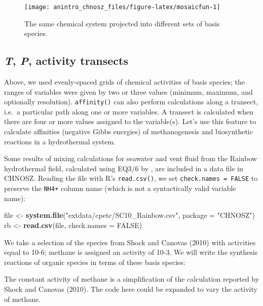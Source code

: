 \documentclass[]{tufte-handout}
\newenvironment{Shaded}{}{}
\newcommand{\KeywordTok}[1]{\textcolor[rgb]{0.00,0.44,0.13}{\textbf{#1}}}
\newcommand{\DataTypeTok}[1]{\textcolor[rgb]{0.56,0.13,0.00}{#1}}
\newcommand{\StringTok}[1]{\textcolor[rgb]{0.25,0.44,0.63}{#1}}
\newcommand{\OtherTok}[1]{\textcolor[rgb]{0.00,0.44,0.13}{#1}}
\newcommand{\NormalTok}[1]{#1}
\begin{document}
\begin{figure}
\texttt{[image: anintro\_chnosz\_files/figure-latex/mosaicfun-1]} \caption[The same chemical system projected into different sets of basis species]{The same chemical system projected into different sets of basis species.}\label{fig:mosaicfun}
\end{figure}

\hypertarget{t-p-activity-transects}{\subsection{\texorpdfstring{\emph{T},
\emph{P}, activity
transects}{T, P, activity transects}}\label{t-p-activity-transects}}

Above, we used evenly-spaced grids of chemical activities of basis
species; the ranges of variables were given by two or three values
(minimum, maximum, and optionally resolution). {\texttt{affinity()}} can
also perform calculations along a transect, i.e.~a particular path along
one or more variables. A transect is calculated when there are four or
more values assigned to the variable(s). Let's use this feature to
calculate affinities (negative Gibbs energies) of methanogenesis and
biosynthetic reactions in a hydrothermal system.

Some results of mixing calculations for seawater and vent fluid from the
Rainbow hydrothermal field, calculated using EQ3/6 by \citet{SC10}, are
included in a data file in CHNOSZ. Reading the file with R's
\texttt{read.csv()}, we set \texttt{check.names\ =\ FALSE} to preserve
the \texttt{NH4+} column name (which is not a syntactically valid
variable name):

\begin{Shaded}
\begin{Highlighting}[]
\NormalTok{file <-}\StringTok{ }\KeywordTok{system.file}\NormalTok{(}\StringTok{"extdata/cpetc/SC10_Rainbow.csv"}\NormalTok{, }\DataTypeTok{package =} \StringTok{"CHNOSZ"}\NormalTok{)}
\NormalTok{rb <-}\StringTok{ }\KeywordTok{read.csv}\NormalTok{(file, }\DataTypeTok{check.names =} \OtherTok{FALSE}\NormalTok{)}
\end{Highlighting}
\end{Shaded}

We take a selection of the species from Shock and Canovas (2010) with
activities equal to 10-6; methane is assigned an activity of 10-3. We
will write the synthesis reactions of organic species in terms of these
basis species:

\begin{marginfigure}
The constant activity of methane is a simplification of the calculation
reported by Shock and Canovas (2010). The code here could be expanded to
vary the activity of methane.
\end{marginfigure}
\end{document}
